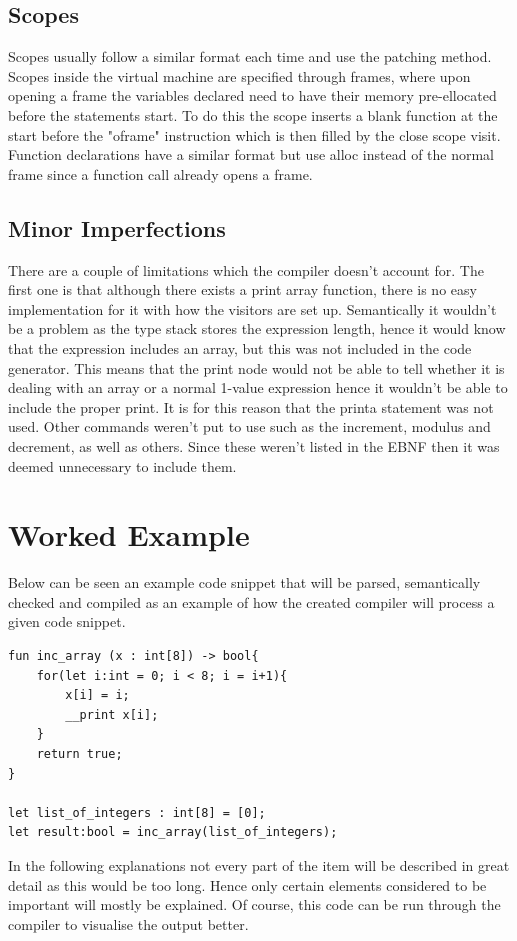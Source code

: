 \documentclass[12pt, a4paper]{report}
\begin{document}
\section{Scopes}
Scopes usually follow a similar format each time and use the patching method. Scopes inside the virtual machine are specified through frames, where upon opening a frame the variables declared need to have their memory pre-ellocated before the statements start. To do this the scope inserts a blank function at the start before the "oframe" instruction which is then filled by the close scope visit. Function declarations have a similar format but use alloc instead of the normal frame since a function call already opens a frame.

\section{Minor Imperfections}

There are a couple of limitations which the compiler doesn't account for. The first one is that although there exists a print array function, there is no easy implementation for it with how the visitors are set up. Semantically it wouldn't be a problem as the type stack stores the expression length, hence it would know that the expression includes an array, but this was not included in the code generator. This means that the print node would not be able to tell whether it is dealing with an array or a normal 1-value expression hence it wouldn't be able to include the proper print. It is for this reason that the printa statement was not used. Other commands weren't put to use such as the increment, modulus and decrement, as well as others. Since these weren't listed in the EBNF then it was deemed unnecessary to include them.

\chapter{Worked Example}
Below can be seen an example code snippet that will be parsed, semantically checked and compiled as an example of how the created compiler will process a given code snippet.

\begin{verbatim}
fun inc_array (x : int[8]) -> bool{
    for(let i:int = 0; i < 8; i = i+1){
        x[i] = i;
        __print x[i];
    }
    return true;
}

let list_of_integers : int[8] = [0];
let result:bool = inc_array(list_of_integers);
\end{verbatim}
In the following explanations not every part of the item will be described in great detail as this would be too long. Hence only certain elements considered to be important will mostly be explained. Of course, this code can be run through the compiler to visualise the output better.
\end{document}
